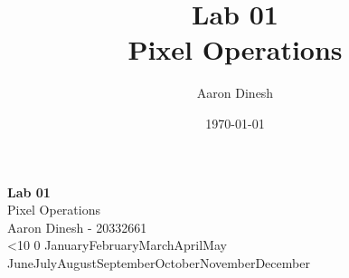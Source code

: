 \documentclass{article}
\title{
    \textbf{Lab 01}\\
    \vspace{1mm}
    {Pixel Operations}
}
\author{Aaron Dinesh}
\date{\today}
\renewcommand{\today}{\ifnum\number\day<10 0\fi \number\day \space%
\ifcase \month \or January\or February\or March\or April\or May%
\or June\or July\or August\or September\or October\or November\or December\fi \space%
\number \year}
\begin{document}
    \fancyfoot{}


    \begin{titlepage}
        \vspace*{\fill}
        \begin{center}
          {\Huge \textbf{Lab 01}}\\[0.5cm]
          {\Large Pixel Operations}\\[0.4cm]
          {\Large Aaron Dinesh - 20332661}\\[0.3cm]
          \today
        \end{center}
        \vspace*{\fill}
    \end{titlepage}
    \newpage
    
    
    
    
    
\end{document}
